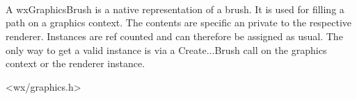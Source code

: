 
\section{}\label{wxgraphicsbrush}


\\

A wxGraphicsBrush is a native representation of a brush. It is used for filling a path on a graphics context. The contents are specific an private to the respective renderer. Instances are ref counted and can therefore be assigned as usual. The only way to get a valid instance is via a Create...Brush call on the graphics context or the renderer instance.


<wx/graphics.h>




